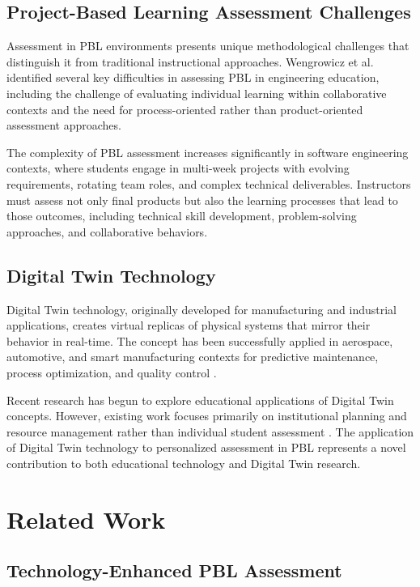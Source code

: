 \documentclass[review]{elsarticle}
\begin{document}
\subsection{Project-Based Learning Assessment Challenges}
\label{sec:pbl_challenges}

Assessment in PBL environments presents unique methodological challenges that distinguish it from traditional instructional approaches. Wengrowicz et al. \cite{wengrowicz2017} identified several key difficulties in assessing PBL in engineering education, including the challenge of evaluating individual learning within collaborative contexts and the need for process-oriented rather than product-oriented assessment approaches.

The complexity of PBL assessment increases significantly in software engineering contexts, where students engage in multi-week projects with evolving requirements, rotating team roles, and complex technical deliverables. Instructors must assess not only final products but also the learning processes that lead to those outcomes, including technical skill development, problem-solving approaches, and collaborative behaviors.

\subsection{Digital Twin Technology}
\label{sec:digital_twin}

Digital Twin technology, originally developed for manufacturing and industrial applications, creates virtual replicas of physical systems that mirror their behavior in real-time. The concept has been successfully applied in aerospace, automotive, and smart manufacturing contexts for predictive maintenance, process optimization, and quality control \cite{grieves2014, qi2018}.

Recent research has begun to explore educational applications of Digital Twin concepts. However, existing work focuses primarily on institutional planning and resource management rather than individual student assessment \cite{sheppard2023}. The application of Digital Twin technology to personalized assessment in PBL represents a novel contribution to both educational technology and Digital Twin research.

\section{Related Work}
\label{sec:related}

\subsection{Technology-Enhanced PBL Assessment}
\label{sec:tech_assessment}
\end{document}
